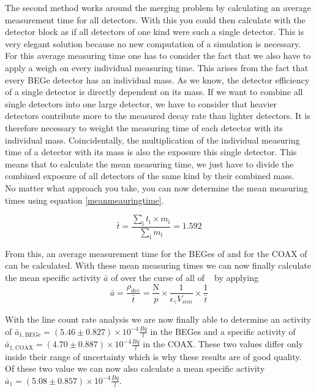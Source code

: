 The second method works around the merging problem by calculating an average measurement time for all detectors.
With this you could then calculate with the detector block as if all detectors of one kind were such a single detector.
This is very elegant solution because no new computation of a simulation is necessary.
\\

For this average measuring time one has to consider the fact that we also have to apply a weigh on every individual measuring time.
This arises from the fact that every BEGe detector has an individual mass.
As we know, the detector efficiency of a single detector is directly dependent on its mass.
If we want to combine all single detectors into one large detector, we have to consider that heavier detectors contribute more to the measured decay rate than lighter detectors.
It is therefore necessary to weight the measuring time of each detector with its individual mass.
Coincidentally, the multiplication of the individual measuring time of a detector with its mass is also the exposure this  single detector.
This means that to calculate the mean measuring time, we just have to divide the combined exposure of all detectors of the same kind by their combined mass.
\\

No matter what approach you take, you can now determine the mean measuring times using equation \ref{meanmeauringtime}.

\begin{equation*}
    \bar{t} = \frac{\sum_\mathrm{i} t_\mathrm{i} \times m_\mathrm{i}}{\sum_\mathrm{i} m_\mathrm{i}} = 1.592
\label{meanmeauringtime}
\end{equation*}

From this, an average measurement time for the BEGes of  and for the COAX of can be calculated.
With these mean measuring times we can now finally calculate the mean specific activity $\bar{a}$ of \Kr over the curse of all of \PII~ by applying
\begin{equation*}
    \bar{a} = \frac{\rho_{dec} }{\bar{t}} = \frac{\mathrm{N}}{p}\times\frac{1}{\epsilon_\gamma V_{sim}}\times\frac{1}{\bar{t}}
\end{equation*}


With the line count rate analysis we are now finally able to determine an activity of $\bar{a}_{\mathrm{1,BEGe}} = (5.46\pm0.827)\times10^{-4}	\frac{\unit{Bq}}{\unit{l}}$ in the BEGes and a specific activity of $\bar{a}_{\mathrm{1,COAX}} = (4.70\pm0.887)\times10^{-4}	\frac{\unit{Bq}}{\unit{l}}$ in the COAX.
These two values differ only inside their range of uncertainty which is why these results are of good quality.
Of these two value we can now also calculate a mean specific activity $\bar{a}_{1} = (5.08\pm0.857)\times10^{-4}\frac{\unit{Bq}}{\unit{l}}$.
\\

